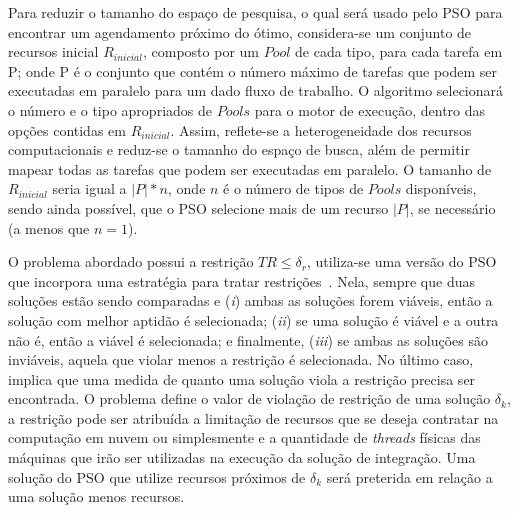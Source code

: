Para reduzir o tamanho do espaço de pesquisa, o qual será usado pelo PSO para encontrar um agendamento próximo do ótimo, considera-se um conjunto de recursos inicial $R_{inicial}$, composto por um $Pool$ de cada tipo, para cada tarefa em P; onde P é o conjunto que contém o número máximo de tarefas que podem ser executadas em paralelo para um dado fluxo de trabalho. O algoritmo selecionará o número e o tipo apropriados de $Pools$ para o motor de execução, dentro das opções contidas em $R_{inicial}$. Assim, reflete-se a heterogeneidade dos recursos computacionais e reduz-se o tamanho do espaço de busca, além de permitir mapear todas as tarefas que podem ser executadas em paralelo. O tamanho de $R_{inicial}$ seria igual a $\left| P \right|*n$, onde $n$ é o número de tipos de $Pools$ disponíveis, sendo ainda possível, que o PSO selecione mais de um recurso $\left| P \right|$, se necessário (a menos que $n = 1$).

O problema abordado possui a restrição  ${TR \le {\delta _r}} $, utiliza-se uma versão do PSO que incorpora uma estratégia para tratar restrições~\cite{deb2002}. Nela, sempre que duas soluções estão sendo comparadas e (\textit{i}) ambas as soluções forem viáveis, então a solução com melhor aptidão é selecionada; (\textit{ii}) se uma solução é viável e a outra não é, então a viável é selecionada; e finalmente, (\textit{iii}) se ambas as soluções são inviáveis, aquela que violar menos a restrição é selecionada. No último caso, implica que uma medida de quanto uma solução viola a restrição precisa ser encontrada. O problema define o valor de violação de restrição de uma solução $\delta_k $, a restrição pode ser atribuída a limitação de recursos que se deseja contratar na computação em nuvem ou simplesmente e a quantidade de \emph{threads} físicas das máquinas que irão ser utilizadas na execução da solução de integração. Uma solução do PSO que utilize recursos próximos de $\delta_k$ será preterida em relação a uma solução menos recursos.

